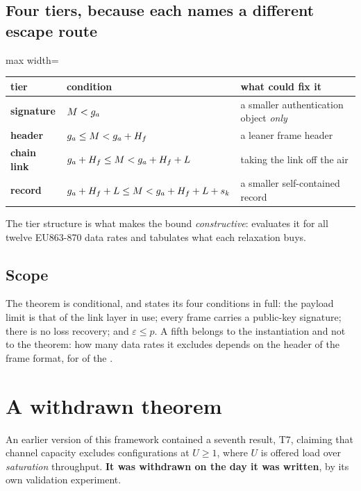 \subsection{Four tiers, because each names a different escape route}

\begin{center}
\begin{adjustbox}{max width=\textwidth}
\begin{tabular}{lll}
\toprule
tier & condition & what could fix it \\
\midrule
\textbf{signature}  & $M < g_a$ & a smaller authentication object \emph{only} \\
\textbf{header}     & $g_a \leq M < g_a + H_f$ & a leaner frame header \\
\textbf{chain link} & $g_a + H_f \leq M < g_a + H_f + L$ & taking the link off the air \\
\textbf{record}     & $g_a + H_f + L \leq M < g_a + H_f + L + s_k$ & a smaller self-contained record \\
\bottomrule
\end{tabular}
\end{adjustbox}
\end{center}

The tier structure is what makes the bound \emph{constructive}:  evaluates it
for all twelve EU863-870 data rates and tabulates what each relaxation buys.

\subsection{Scope}

The theorem is conditional, and  states its four conditions in full: the payload
limit is that of the link layer in use; every frame carries a public-key signature; there is no
loss recovery; and $\varepsilon \leq p$. A fifth belongs to the instantiation and not to the
theorem: how many data rates it excludes depends on the header of the frame format, for
\exclFmtCount{} of the \exclCount.

\section{A withdrawn theorem}

An earlier version of this framework contained a seventh result, T7, claiming that channel capacity
excludes configurations at $U \geq 1$, where $U$ is offered load over \emph{saturation} throughput.
\textbf{It was withdrawn on the day it was written}, by its own validation experiment.

